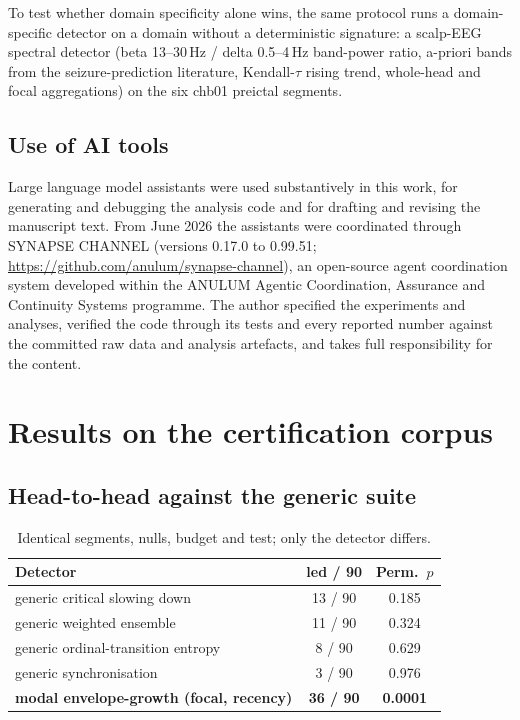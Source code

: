 \documentclass[aip,cha,preprint,amsmath,amssymb]{revtex4-2}
\begin{document}
To test whether domain specificity alone wins, the same protocol runs a
domain-specific detector on a domain without a deterministic signature:
a scalp-EEG spectral detector (beta 13--30\,Hz / delta 0.5--4\,Hz
band-power ratio, a-priori bands from the seizure-prediction
literature, Kendall-$\tau$ rising trend, whole-head and focal
aggregations) on the six chb01 preictal segments.

\subsection{Use of AI tools}\label{sec:aiuse}

Large language model assistants were used substantively in this work,
for generating and debugging the analysis code and for drafting and
revising the manuscript text. From June 2026 the assistants were
coordinated through SYNAPSE CHANNEL (versions 0.17.0 to 0.99.51;
\url{https://github.com/anulum/synapse-channel}), an open-source agent
coordination system developed within the ANULUM Agentic Coordination,
Assurance and Continuity Systems programme. The author specified the
experiments and analyses, verified the code through its tests and every
reported number against the committed raw data and analysis artefacts,
and takes full responsibility for the content.

\section{Results on the certification corpus}\label{sec:grid}

\subsection{Head-to-head against the generic suite}

\begin{table}[h!]
\centering
\small
\setlength{\tabcolsep}{3.5pt}
\begin{tabular}{lcc}
\toprule
Detector & led / 90 & Perm.\ $p$ \\
\midrule
generic critical slowing down & 13 / 90 & 0.185 \\
generic weighted ensemble & 11 / 90 & 0.324 \\
generic ordinal-transition entropy & 8 / 90 & 0.629 \\
generic synchronisation & 3 / 90 & 0.976 \\
\textbf{modal envelope-growth (focal, recency)} & \textbf{36 / 90} & \textbf{0.0001} \\
\bottomrule
\end{tabular}
\caption{Identical segments, nulls, budget and test; only the detector
differs.}
\label{tab:headtohead}
\end{table}
\end{document}
